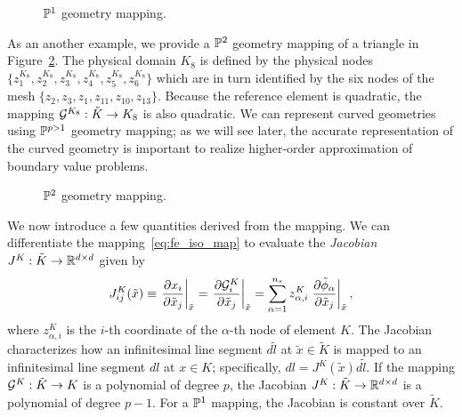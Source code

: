 \begin{figure}
  \centering
  \caption{$\mathbb{P}^1$ geometry mapping. \label{fig:fe_impl_isomap_p1}}
\end{figure}

As an another example, we provide a $\mathbb{P}^2$ geometry mapping of a triangle in Figure~\ref{fig:fe_impl_isomap_p2}. The physical domain $K_8$ is defined by the physical nodes $\{ z_1^{K_8}, z_2^{K_8}, z_3^{K_8}, z_4^{K_8}, z_5^{K_8}, z_6^{K_8} \}$ which are in turn identified by the six nodes of the mesh $\{ z_2, z_3, z_1, z_{11}, z_{10}, z_{13} \}$.  Because the reference element is quadratic, the mapping $\mathcal{G}^{K_8}: \tilde K \to K_8$ is also quadratic.  We can represent curved geometries using $\mathbb{P}^{p>1}$ geometry mapping; as we will see later, the accurate representation of the curved geometry is important to realize higher-order approximation of boundary value problems. 

\begin{figure}
  \centering
  \caption{$\mathbb{P}^2$ geometry mapping. \label{fig:fe_impl_isomap_p2}}
\end{figure}

We now introduce a few quantities derived from the mapping.  We can differentiate the mapping~\eqref{eq:fe_iso_map} to evaluate the \emph{Jacobian} $J^K: \tilde K \to \mathbb{R}^{d \times d}$ given by
\begin{equation*}
  J^K_{ij}(\tilde x)
  \equiv \left. \frac{\partial x_i}{\partial \tilde x_j} \right|_{\tilde x}
  = \left. \frac{\partial \mathcal{G}^K_i}{\partial \tilde x_j} \right|_{\tilde x}
  = \sum_{\alpha= 1}^{n_s} z^K_{\alpha,i} \left. \frac{\partial \tilde \phi_\alpha}{\partial \tilde x_j} \right|_{\tilde x},
\end{equation*}
where $z^K_{\alpha,i}$ is the $i$-th coordinate of the $\alpha$-th node of element $K$. The Jacobian characterizes how an infinitesimal line segment $d\tilde l$ at $\tilde x \in \tilde K$ is mapped to an infinitesimal line segment $dl$ at $x \in K$; specifically, $dl = J^K(\tilde x) d\tilde l$.  If the mapping $\mathcal{G}^K: \tilde K \to K$ is a polynomial of degree $p$, the Jacobian $J^K: \tilde K \to \mathbb{R}^{d \times d}$ is a polynomial of degree $p-1$. For a $\mathbb{P}^1$ mapping, the Jacobian is constant over $\tilde K$.


